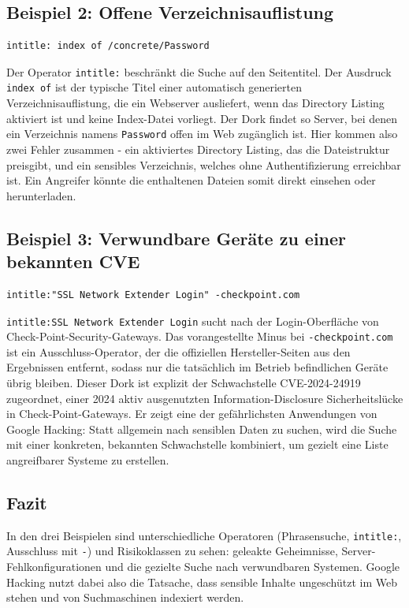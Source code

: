\documentclass[11pt,a4paper]{article}
\begin{document}
\subsection{Beispiel 2: Offene Verzeichnisauflistung}
\begin{lstlisting}[caption={GHDB-ID 8424}]
intitle: index of /concrete/Password
\end{lstlisting}
Der Operator \texttt{intitle:} beschränkt die Suche auf den Seitentitel. Der Ausdruck \texttt{index of} ist der typische Titel einer automatisch generierten Verzeichnisauflistung, die ein Webserver ausliefert, wenn das Directory Listing aktiviert ist und keine Index-Datei vorliegt. Der Dork findet so Server, bei denen ein Verzeichnis namens \texttt{Password} offen im Web zugänglich ist. Hier kommen also zwei Fehler zusammen - ein aktiviertes Directory Listing, das die Dateistruktur preisgibt, und ein sensibles Verzeichnis, welches ohne Authentifizierung erreichbar ist. Ein Angreifer könnte die enthaltenen Dateien somit direkt einsehen oder herunterladen.

\subsection{Beispiel 3: Verwundbare Geräte zu einer bekannten CVE}
\begin{lstlisting}[caption={GHDB-ID 8447}]
intitle:"SSL Network Extender Login" -checkpoint.com
\end{lstlisting}
\texttt{intitle:\textquotedbl SSL Network Extender Login\textquotedbl} sucht nach der Login-Oberfläche von Check-Point-Security-Gateways. Das vorangestellte Minus bei \texttt{-checkpoint.com} ist ein Ausschluss-Operator, der die offiziellen Hersteller-Seiten aus den Ergebnissen entfernt, sodass nur die tatsächlich im Betrieb befindlichen Geräte übrig bleiben. Dieser Dork ist explizit der Schwachstelle CVE-2024-24919 zugeordnet, einer 2024 aktiv ausgenutzten Information-Disclosure Sicherheitslücke in Check-Point-Gateways. Er zeigt eine der gefährlichsten Anwendungen von Google Hacking: Statt allgemein nach sensiblen Daten zu suchen, wird die Suche mit einer konkreten, bekannten Schwachstelle kombiniert, um gezielt eine Liste angreifbarer Systeme zu erstellen.

\subsection{Fazit}
In den drei Beispielen sind unterschiedliche Operatoren (Phrasensuche, \texttt{intitle:}, Ausschluss mit \texttt{-}) und Risikoklassen zu sehen: geleakte Geheimnisse, Server-Fehlkonfigurationen und die gezielte Suche nach verwundbaren Systemen. Google Hacking nutzt dabei also die Tatsache, dass sensible Inhalte ungeschützt im Web stehen und von Suchmaschinen indexiert werden.
\end{document}

